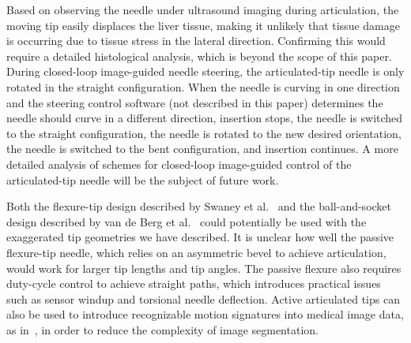 Based on observing the needle under ultrasound imaging during articulation, the moving tip easily displaces the liver tissue, making it unlikely that tissue damage is occurring due to tissue stress in the lateral direction. Confirming this would require a detailed histological analysis, which is beyond the scope of this paper. During closed-loop image-guided needle steering, the articulated-tip needle is only rotated in the straight configuration. When the needle is curving in one direction and the steering control software (not described in this paper) determines the needle should curve in a different direction, insertion stops, the needle is switched to the straight configuration, the needle is rotated to the new desired orientation, the needle is switched to the bent configuration, and insertion continues. A more detailed analysis of schemes for closed-loop image-guided control of the articulated-tip needle will be the subject of future work.

Both the flexure-tip design described by Swaney et al.~\cite{Swaney2013} and the ball-and-socket design described by van de Berg et al.~\cite{vandeBerg2015} could potentially be used with the exaggerated tip geometries we have described. It is unclear how well the passive flexure-tip needle, which relies on an asymmetric bevel to achieve articulation, would work for larger tip lengths and tip angles. The passive flexure also requires duty-cycle control to achieve straight paths, which introduces practical issues such as sensor windup and torsional needle deflection. Active articulated tips can also be used to introduce recognizable motion signatures into medical image data, as in~\cite{Adebar2014}, in order to reduce the complexity of image segmentation.

